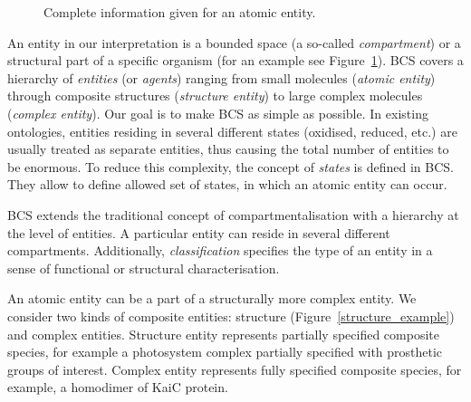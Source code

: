 \documentclass[12pt]{fithesis2}
\begin{document}
\begin{figure}[!h]
\begin{center}
\end{center}
\caption{Complete information given for an atomic entity.}\label{entity_example}
\end{figure}

An entity in our interpretation is a bounded space (a so-called \emph{compartment}) or a structural part of a specific organism (for an example see Figure~\ref{entity_example}). BCS covers a hierarchy of \emph{entities} (or \emph{agents}) ranging from small molecules (\emph{atomic entity}) through composite structures (\emph{structure entity}) to large complex molecules (\emph{complex entity}). Our goal is to make BCS as simple as possible. In existing ontologies, entities residing in several different states (oxidised, reduced, etc.) are usually treated as separate entities, thus causing the total number of entities to be enormous. To reduce this complexity, the concept of \emph{states} is defined in BCS. They allow to define allowed set of states, in which an atomic entity can occur.

BCS extends the traditional concept of compartmentalisation with a hierarchy at the level of entities. A particular entity can reside in several different compartments. Additionally, \emph{classification} specifies the type of an entity in a sense of functional or structural characterisation.

An atomic entity can be a part of a structurally more complex entity. We consider two kinds of composite entities: structure (Figure~\ref{structure_example}) and complex entities. Structure entity represents partially specified composite species, for example a photosystem complex partially specified with prosthetic groups of interest. Complex entity represents fully specified composite species, for example, a homodimer of KaiC protein.
\end{document}
